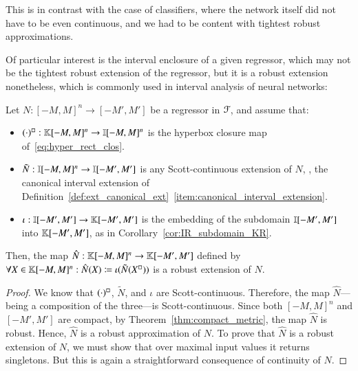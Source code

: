 \documentclass[11pt,times]{article}
\begin{document}
This is in contrast with the case of classifiers, where the network
itself did not have to be even continuous, and we had to be content
with tightest robust approximations.

Of particular interest is the interval enclosure of a given regressor,
which may not be the tightest robust extension of the regressor, but
it is a robust extension nonetheless, which is commonly used in
interval analysis of neural networks:


    
\begin{theorem}
  \label{thm:regressor_interval_robust_extension}
  Let $N: [-M,M]^n \to [-M',M']$ be a regressor in ${\cal
    F}$, and assume that:
  \begin{itemize}
  \item
    $\hbClos{(\cdot)} : \kCPPO{[-M,M]^n} \to \intvaldom[{[-M,M]^n}]$
    is the hyperbox closure map of~\eqref{eq:hyper_rect_clos}.


  \item $\tilde{N}: \intvaldom[{[-M,M]^n}] \to \intvaldom[{[-M',M']}]$
    is any Scott-continuous extension of $N$, {\eg}, the canonical
    interval extension of
    Definition~\ref{def:ext_canonical_ext}~\ref{item:canonical_interval_extension}.


  \item $\iota : \intvaldom[{[-M',M']}] \to \kCPPO{[-M',M']}$ is the
    embedding of the subdomain $\intvaldom[{[-M',M']}]$ into
    $\kCPPO{[-M',M']}$, as in Corollary~\ref{cor:IR_subdomain_KR}.

    
  \end{itemize}
  \noindent
  Then, the map $\hat{N}: \kCPPO{[-M,M]^n} \to \kCPPO{[-M',M']}$
  defined by
  $\forall X \in \kCPPO{[-M,M]^n}: \hat{N}(X) \defeq
  \iota(\tilde{N}(\hbClos{X}))$ is a robust extension of $N$.
\end{theorem}

\begin{proof}
  We know that $\hbClos{(\cdot)}$, $\tilde{N}$, and $\iota$ are
  Scott-continuous. Therefore, the map $\hat{N}$---being a composition
  of the three---is Scott-continuous. Since both $[-M,M]^n$ and
  $[-M',M']$ are compact, by Theorem~\ref{thm:compact_metric}, the map
  $\hat{N}$ is robust. Hence, $\hat{N}$ is a robust approximation of
  $N$. To prove that $\hat{N}$ is a robust extension of $N$, we must
  show that over maximal input values it returns singletons. But this
  is again a straightforward consequence of continuity of $N$.
\end{proof}
\end{document}
